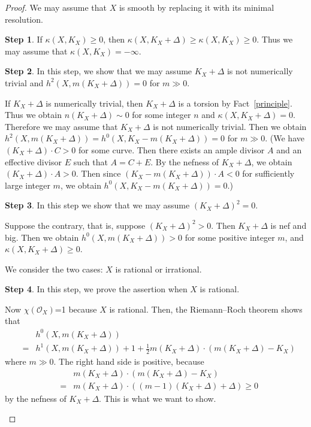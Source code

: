\documentclass[12pt,twoside]{amsart}
\theoremstyle{definition}
\newtheorem{step}{Step}
\begin{document}
\begin{proof}
We may assume that $X$ is smooth by replacing it with its minimal resolution. 

\setcounter{step}{0}
\begin{step}
If $\kappa(X, K_X) \geq 0$, then 
$\kappa(X, K_X+\Delta) \geq \kappa(X, K_X) \geq 0$. 
Thus we may assume that $\kappa(X, K_X)=-\infty$.
\end{step}

\begin{step}
In this step, we show that we may assume 
$K_X+\Delta$ is not numerically trivial and 
$h^2(X, m(K_X+\Delta))=0$ for $m \gg 0$. 

If $K_X+\Delta$ is numerically trivial, then 
$K_X+\Delta$ is a torsion by Fact~\ref{principle}. 
Thus we obtain $n(K_X+\Delta)\sim 0$ for some integer $n$ 
and $\kappa(X, K_X+\Delta)=0.$ 
Therefore we may assume that $K_X+\Delta$ is not numerically trivial. 
Then we obtain $h^2(X, m(K_X+\Delta))=h^0(X, K_X-m(K_X+\Delta))=0$
for $m \gg 0$. 
(We have $(K_X+\Delta)\cdot C>0$ for some curve. 
Then there exists an ample divisor $A$ and an effective divisor $E$ 
such that $A=C+E$. 
By the nefness of $K_X+\Delta$, we obtain $(K_X+\Delta)\cdot A>0$. 
Then since $(K_X-m(K_X+\Delta))\cdot A<0$ for sufficiently large integer $m$, 
we obtain $h^0(X, K_X-m(K_X+\Delta))=0$.)
\end{step}

\begin{step}
In this step we show that we may assume $(K_X+\Delta)^2=0$. 

Suppose the contrary, that is, suppose $(K_X+\Delta)^2>0$. 
Then $K_X+\Delta$ is nef and big. 
Then we obtain $h^0(X, m(K_X+\Delta))>0$ for some positive integer $m$, 
and $\kappa(X, K_X+\Delta)\geq 0$. 
\end{step}

We consider the two cases: $X$ is rational or irrational. 


\begin{step}
In this step, we prove the assertion when $X$ is rational. 

Now $\chi(\mathcal{O}_X)$=1 because $X$ is rational. 
Then, the Riemann--Roch theorem shows that 
\begin{eqnarray*}
&&h^0(X, m(K_X+\Delta))\\
&=&h^1(X, m(K_X+\Delta))+1+\frac{1}{2}m(K_X+\Delta)\cdot(m(K_X+\Delta)-K_X) 
\end{eqnarray*}
where $m \gg 0$.
The right hand side is positive, because 
\begin{eqnarray*}
&&m(K_X+\Delta)\cdot(m(K_X+\Delta)-K_X)\\
&=&m(K_X+\Delta)\cdot((m-1)(K_X+\Delta)+\Delta)\geq 0
\end{eqnarray*}
by the nefness of $K_X+\Delta$. 
This is what we want to show. 
\end{step}



\end{proof}
\end{document}
